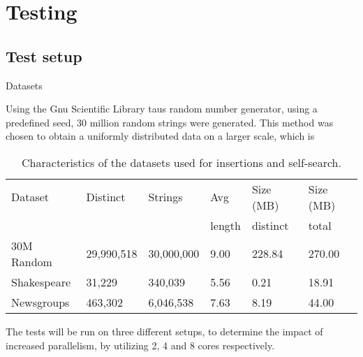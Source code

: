 \chapter{Testing}

\section{Test setup}
Datasets

Using the Gnu Scientific Library taus random number generator, using a predefined seed,
30 million random strings were generated. This method was chosen to obtain a uniformly distributed
data on a larger scale, which is 
\begin{table}[h!]
    \centering
    \begin{tabular}[here]{l l l l l l}
        \hline
        Dataset    & Distinct   & Strings      & Avg     & Size (MB)& Size (MB)\\
                   &            &              & length  & distinct & total    \\\hline
        30M Random & 29,990,518 & 30,000,000   & 9.00    & 228.84   & 270.00\\
        Shakespeare&  31,229    & 340,039      & 5.56    & 0.21     & 18.91\\
        Newsgroups & 463,302    & 6,046,538    & 7.63    & 8.19     & 44.00\\
        \hline
    \end{tabular}
    \caption{Characteristics of the datasets used for insertions and self-search.}
    \label{tab:cpucpecs}
\end{table}


The tests will be run on three different setups, to determine the impact of
increased parallelism, by utilizing 2, 4 and 8 cores respectively.

